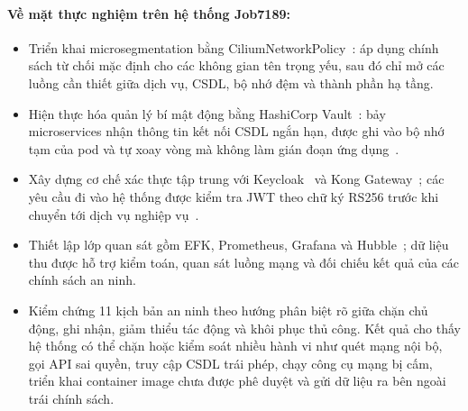 \paragraph{Về mặt thực nghiệm trên hệ thống Job7189:}
\begin{itemize}
    \item Triển khai microsegmentation bằng CiliumNetworkPolicy~\parencite{cilium_docs,ebpf_io}: áp dụng chính sách từ chối mặc định cho các không gian tên trọng yếu, sau đó chỉ mở các luồng cần thiết giữa dịch vụ, CSDL, bộ nhớ đệm và thành phần hạ tầng.
    \item Hiện thực hóa quản lý bí mật động bằng HashiCorp Vault~\parencite{vault_docs}: bảy microservices nhận thông tin kết nối CSDL ngắn hạn, được ghi vào bộ nhớ tạm của pod và tự xoay vòng mà không làm gián đoạn ứng dụng~\parencite{nist800207,machine_identity_report}.
    \item Xây dựng cơ chế xác thực tập trung với Keycloak~\parencite{keycloak_docs} và Kong Gateway~\parencite{kong_docs}; các yêu cầu đi vào hệ thống được kiểm tra JWT theo chữ ký RS256 trước khi chuyển tới dịch vụ nghiệp vụ~\parencite{rfc7519_jwt,oidc_core,rfc6749_oauth2}.
    \item Thiết lập lớp quan sát gồm EFK, Prometheus, Grafana và Hubble~\parencite{elk_docs,prometheus_docs,grafana_docs,hubble_docs}; dữ liệu thu được hỗ trợ kiểm toán, quan sát luồng mạng và đối chiếu kết quả của các chính sách an ninh.
    \item Kiểm chứng 11 kịch bản an ninh theo hướng phân biệt rõ giữa chặn chủ động, ghi nhận, giảm thiểu tác động và khôi phục thủ công. Kết quả cho thấy hệ thống có thể chặn hoặc kiểm soát nhiều hành vi như quét mạng nội bộ, gọi API sai quyền, truy cập CSDL trái phép, chạy công cụ mạng bị cấm, triển khai container image chưa được phê duyệt và gửi dữ liệu ra bên ngoài trái chính sách.
\end{itemize}

